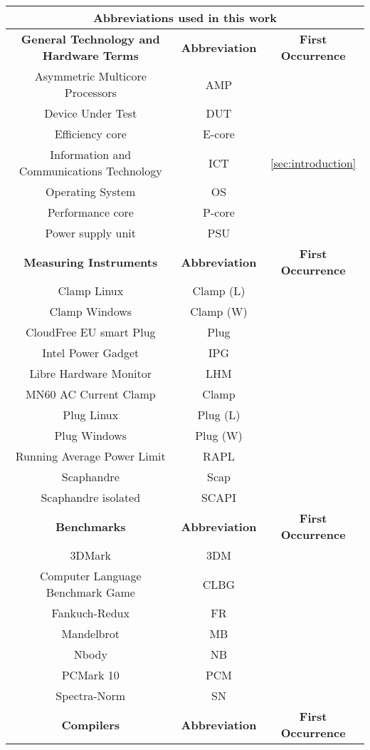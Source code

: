 \begin{table}[H]
    \centering
    \begin{tabular}{|| c | c | c ||}
    \hline
    \multicolumn{3}{||c||}{\textbf{Abbreviations used in this work}} \\ [0.5ex] \hline\hline
    \textbf{General Technology and Hardware Terms} & \textbf{Abbreviation} & \textbf{First Occurrence} \\\hline
    Asymmetric Multicore Processors & AMP & \\
    Device Under Test & DUT &\\
    Efficiency core & E-core & \\
    Information and Communications Technology & ICT & \cref{sec:introduction}\\
    Operating System & OS &\\
    Performance core & P-core & \\
    Power supply unit & PSU &\\ \hline
    \textbf{Measuring Instruments} & \textbf{Abbreviation} & \textbf{First Occurrence} \\\hline
    Clamp Linux& Clamp (L) &\\
    Clamp Windows & Clamp (W) &\\
    CloudFree EU smart Plug & Plug &\\
    Intel Power Gadget & IPG &\\
    Libre Hardware Monitor & LHM &\\
    MN60 AC Current Clamp & Clamp &\\
    Plug Linux & Plug (L) &\\
    Plug Windows & Plug (W) &\\
    Running Average Power Limit & RAPL &\\
    Scaphandre & Scap &\\
    Scaphandre isolated  & SCAPI &\\\hline
    \textbf{Benchmarks} & \textbf{Abbreviation} & \textbf{First Occurrence} \\\hline
    3DMark  & 3DM &\\
    Computer Language Benchmark Game  & CLBG &\\
    Fankuch-Redux& FR &\\
    Mandelbrot& MB &\\
    Nbody & NB &\\
    PCMark 10  & PCM &\\
    Spectra-Norm & SN &\\\hline
    \textbf{Compilers} & \textbf{Abbreviation} & \textbf{First Occurrence} \\\hline

\end{tabular}
\end{table}
